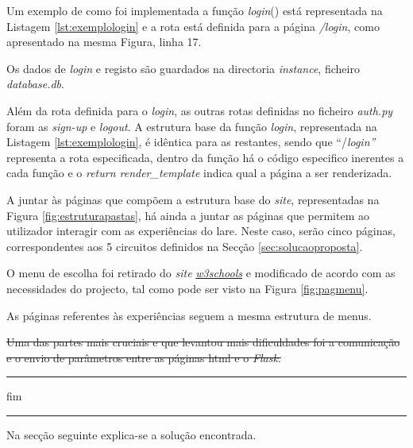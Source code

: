 Um exemplo de como foi implementada a função \textit{login}() está representada na Listagem \ref{lst:exemplologin} e a rota está definida para a página \textit{/login}, como apresentado na mesma Figura, linha 17.

Os dados de \textit{login} e registo são guardados na directoria \textit{instance}, ficheiro \textit{database.db}.

Além da rota definida para o \textit{login}, as outras rotas definidas no ficheiro \textit{auth.py} foram as \textit{sign-up} e \textit{logout}. A estrutura base da função \textit{login}, representada na Listagem \ref{lst:exemplologin}, é idêntica para as restantes, sendo que ``/\textit{login''} representa a rota especificada, dentro da função há o código especifico inerentes a cada função e o \textit{return render\_template} indica qual a página a ser renderizada.

A juntar às páginas que compõem a estrutura base do \textit{site}, representadas na Figura \ref{fig:estruturapastas}, há ainda a juntar as páginas que permitem ao utilizador interagir com as experiências do \acrshort{lare}. Neste caso, serão cinco páginas, correspondentes aos 5 circuitos definidos na Secção \ref{sec:solucaoproposta}.

O menu de escolha foi retirado do \textit{site} \href{https://www.w3schools.com/howto/howto_js_vertical_tabs.asp}{\textit{w3schools}} e modificado de acordo com as necessidades do projecto, tal como pode ser visto na Figura \ref{fig:pagmenu}.

As páginas referentes às experiências seguem a mesma estrutura de menus.

\sout{Uma das partes mais cruciais e que levantou mais dificuldades foi a comunicação e o envio de parâmetros entre as páginas \acrshort{html} e o \textit{Flask}.}

\hrule
fim
\hrule

Na secção seguinte explica-se a solução encontrada.
